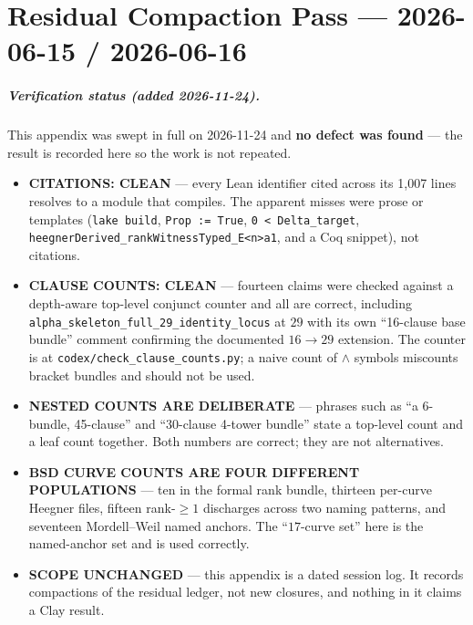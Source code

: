 %

\chapter{Residual Compaction Pass --- 2026-06-15 / 2026-06-16}
\label{app:residual-compaction-2026-06-15-16}

\paragraph{Verification status (added 2026-11-24).} This appendix was swept in
full on 2026-11-24 and \textbf{no defect was found} --- the result is recorded
here so the work is not repeated.
\begin{itemize}
\item \textbf{CITATIONS: CLEAN} --- every Lean identifier cited across its
  1{,}007 lines resolves to a module that compiles. The apparent misses were
  prose or templates (\texttt{lake build}, \texttt{Prop := True},
  \texttt{0 < Delta\_target}, \texttt{heegnerDerived\_rankWitnessTyped\_E<n>a1},
  and a Coq snippet), not citations.
\item \textbf{CLAUSE COUNTS: CLEAN} --- fourteen claims were checked against a
  depth-aware top-level conjunct counter and all are correct, including
  \texttt{alpha\_skeleton\_full\_29\_identity\_locus} at $29$ with its own
  ``16-clause base bundle'' comment confirming the documented $16 \to 29$
  extension. The counter is at \texttt{codex/check\_clause\_counts.py}; a naive
  count of $\wedge$ symbols miscounts bracket bundles and should not be used.
\item \textbf{NESTED COUNTS ARE DELIBERATE} --- phrases such as ``a 6-bundle,
  45-clause'' and ``30-clause 4-tower bundle'' state a top-level count and a
  leaf count together. Both numbers are correct; they are not alternatives.
\item \textbf{BSD CURVE COUNTS ARE FOUR DIFFERENT POPULATIONS} --- ten in the
  formal rank bundle, thirteen per-curve Heegner files, fifteen rank-$\geq 1$
  discharges across two naming patterns, and seventeen Mordell--Weil named
  anchors. The ``$17$-curve set'' here is the named-anchor set and is used
  correctly.
\item \textbf{SCOPE UNCHANGED} --- this appendix is a dated session log. It
  records compactions of the residual ledger, not new closures, and nothing in
  it claims a Clay result.
\end{itemize}

